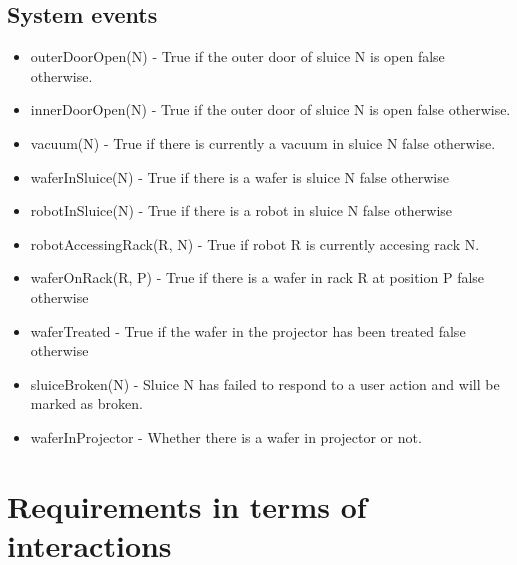 \documentclass[12pt]{report}
\begin{document}
	\section{System events}
	\begin{itemize}
\item outerDoorOpen(N) - True if the outer door of sluice N is open false otherwise.
\item innerDoorOpen(N) - True if the outer door of sluice N is open false otherwise.
\item vacuum(N) - True if there is currently a vacuum in sluice N false otherwise.
\item waferInSluice(N) - True if there is a wafer is sluice N false otherwise
\item robotInSluice(N) - True if there is a robot in sluice N false otherwise
\item robotAccessingRack(R, N) -  True if robot R is currently accesing rack N.
\item waferOnRack(R, P) - True if there is a wafer in rack R at position P false otherwise
\item waferTreated - True if the wafer in the projector has been treated false otherwise
\item sluiceBroken(N) - Sluice N has failed to respond to a user action and will be marked as broken.
\item waferInProjector - Whether there is a wafer in projector or not.
	\end{itemize}
	
	\chapter{Requirements in terms of interactions}
\end{document}
